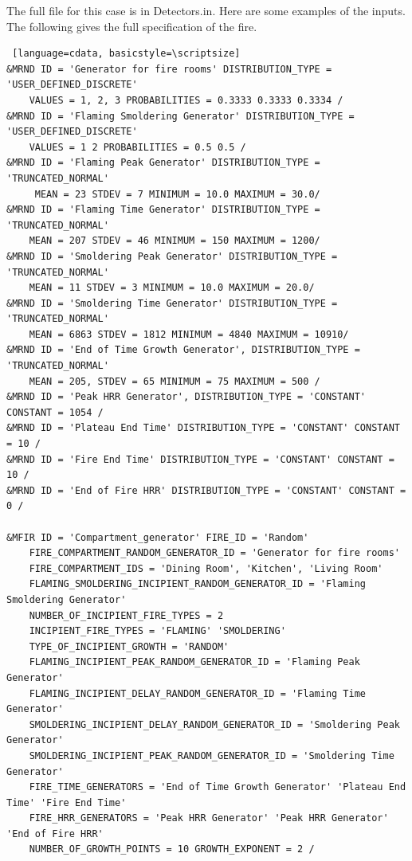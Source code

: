 \documentclass[12pt,twoside]{book}
\begin{document}
The full file for this case is in Detectors.in. Here are some examples of the inputs. The following gives the full specification of the fire.

\vspace{\baselineskip}
\begin{lstlisting} [language=cdata, basicstyle=\scriptsize]
&MRND ID = 'Generator for fire rooms' DISTRIBUTION_TYPE = 'USER_DEFINED_DISCRETE' 
	VALUES = 1, 2, 3 PROBABILITIES = 0.3333 0.3333 0.3334 /
&MRND ID = 'Flaming Smoldering Generator' DISTRIBUTION_TYPE = 'USER_DEFINED_DISCRETE' 
	VALUES = 1 2 PROBABILITIES = 0.5 0.5 /
&MRND ID = 'Flaming Peak Generator' DISTRIBUTION_TYPE = 'TRUNCATED_NORMAL'
	 MEAN = 23 STDEV = 7 MINIMUM = 10.0 MAXIMUM = 30.0/
&MRND ID = 'Flaming Time Generator' DISTRIBUTION_TYPE = 'TRUNCATED_NORMAL' 
	MEAN = 207 STDEV = 46 MINIMUM = 150 MAXIMUM = 1200/
&MRND ID = 'Smoldering Peak Generator' DISTRIBUTION_TYPE = 'TRUNCATED_NORMAL'
	MEAN = 11 STDEV = 3 MINIMUM = 10.0 MAXIMUM = 20.0/
&MRND ID = 'Smoldering Time Generator' DISTRIBUTION_TYPE = 'TRUNCATED_NORMAL'
	MEAN = 6863 STDEV = 1812 MINIMUM = 4840 MAXIMUM = 10910/
&MRND ID = 'End of Time Growth Generator', DISTRIBUTION_TYPE = 'TRUNCATED_NORMAL' 
	MEAN = 205, STDEV = 65 MINIMUM = 75 MAXIMUM = 500 /
&MRND ID = 'Peak HRR Generator', DISTRIBUTION_TYPE = 'CONSTANT' CONSTANT = 1054 /
&MRND ID = 'Plateau End Time' DISTRIBUTION_TYPE = 'CONSTANT' CONSTANT = 10 /
&MRND ID = 'Fire End Time' DISTRIBUTION_TYPE = 'CONSTANT' CONSTANT = 10 /
&MRND ID = 'End of Fire HRR' DISTRIBUTION_TYPE = 'CONSTANT' CONSTANT = 0 /

&MFIR ID = 'Compartment_generator' FIRE_ID = 'Random'
	FIRE_COMPARTMENT_RANDOM_GENERATOR_ID = 'Generator for fire rooms'
    FIRE_COMPARTMENT_IDS = 'Dining Room', 'Kitchen', 'Living Room'
    FLAMING_SMOLDERING_INCIPIENT_RANDOM_GENERATOR_ID = 'Flaming Smoldering Generator'
	NUMBER_OF_INCIPIENT_FIRE_TYPES = 2
    INCIPIENT_FIRE_TYPES = 'FLAMING' 'SMOLDERING'
	TYPE_OF_INCIPIENT_GROWTH = 'RANDOM'
	FLAMING_INCIPIENT_PEAK_RANDOM_GENERATOR_ID = 'Flaming Peak Generator'
    FLAMING_INCIPIENT_DELAY_RANDOM_GENERATOR_ID = 'Flaming Time Generator'
    SMOLDERING_INCIPIENT_DELAY_RANDOM_GENERATOR_ID = 'Smoldering Peak Generator'
    SMOLDERING_INCIPIENT_PEAK_RANDOM_GENERATOR_ID = 'Smoldering Time Generator'
	FIRE_TIME_GENERATORS = 'End of Time Growth Generator' 'Plateau End Time' 'Fire End Time'
	FIRE_HRR_GENERATORS = 'Peak HRR Generator' 'Peak HRR Generator' 'End of Fire HRR'
    NUMBER_OF_GROWTH_POINTS = 10 GROWTH_EXPONENT = 2 /
\end{lstlisting}
\end{document}
